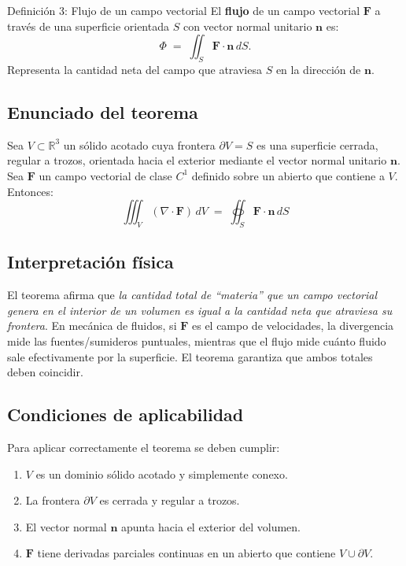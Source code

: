 \documentclass[12pt,a4paper]{article}
\begin{document}
\begin{cajadefinicion}{Definición 3: Flujo de un campo vectorial}
El \textbf{flujo} de un campo vectorial $\mathbf{F}$ a través de una superficie orientada $S$ con vector normal unitario $\mathbf{n}$ es:
\[
\Phi \;=\; \iint_{S} \mathbf{F}\cdot\mathbf{n}\, dS.
\]
Representa la cantidad neta del campo que atraviesa $S$ en la dirección de $\mathbf{n}$.
\end{cajadefinicion}

\subsection{Enunciado del teorema}

\begin{cajateorema}
Sea $V\subset \mathbb{R}^3$ un sólido acotado cuya frontera $\partial V = S$ es una superficie cerrada, regular a trozos, orientada hacia el exterior mediante el vector normal unitario $\mathbf{n}$. Sea $\mathbf{F}$ un campo vectorial de clase $C^1$ definido sobre un abierto que contiene a $V$. Entonces:
\[
\iiint_{V} (\nabla \cdot \mathbf{F}) \, dV \;=\;
\oiint_{S} \mathbf{F}\cdot \mathbf{n}\, dS
\]
\end{cajateorema}

\subsection{Interpretación física}

El teorema afirma que \emph{la cantidad total de ``materia'' que un campo vectorial genera en el interior de un volumen es igual a la cantidad neta que atraviesa su frontera}. En mecánica de fluidos, si $\mathbf{F}$ es el campo de velocidades, la divergencia mide las fuentes/sumideros puntuales, mientras que el flujo mide cuánto fluido sale efectivamente por la superficie. El teorema garantiza que ambos totales deben coincidir.

\subsection{Condiciones de aplicabilidad}

Para aplicar correctamente el teorema se deben cumplir:
\begin{enumerate}[leftmargin=1.5cm]
    \item $V$ es un dominio sólido acotado y simplemente conexo.
    \item La frontera $\partial V$ es cerrada y regular a trozos.
    \item El vector normal $\mathbf{n}$ apunta hacia el exterior del volumen.
    \item $\mathbf{F}$ tiene derivadas parciales continuas en un abierto que contiene $V\cup\partial V$.
\end{enumerate}
\end{document}

